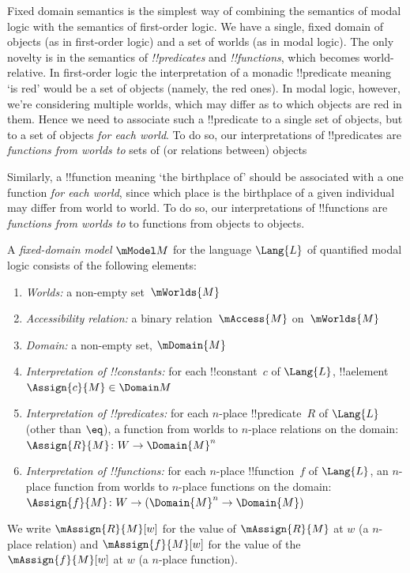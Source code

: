 \documentclass[../../../include/open-logic-section]{subfiles}
\begin{document}


\begin{explain}
Fixed domain semantics is the simplest way of combining the semantics
of modal logic with the semantics of first-order logic. We have a 
single, fixed domain of objects (as in first-order logic) and a 
set of worlds (as in modal logic). The only novelty is in the 
semantics of \emph{!!{predicate}s} and \emph{!!{function}s}, which becomes world-relative. 
In first-order logic the interpretation of a monadic !!{predicate} 
meaning `is red' would be a set of objects (namely, the red ones). 
In modal logic, however, we're considering
multiple worlds, which may differ as to which objects are red in them. 
Hence we need to associate such a !!{predicate} to a single set of 
objects, but to a set of objects \emph{for each world}. To do so,
our interpretations of !!{predicate}s are \emph{functions from worlds to} 
sets of (or relations between) objects

Similarly, a 
!!{function} meaning `the birthplace of' should be associated with a 
one function \emph{for each world}, since which place is the birthplace of a given 
individual may differ from world to world. To do so, our 
interpretations of !!{function}s are \emph{functions from worlds to} 
to functions from objects to objects.
\end{explain}

\begin{defn}
    A \emph{fixed-domain model} $\mModel M$ for the language $\Lang{L}$ 
    of quantified modal logic consists of the following elements:
    \begin{enumerate}
    \item \emph{Worlds:} a non-empty set~$\mWorlds{M}$
    \item \emph{Accessibility relation:} a binary relation~$\mAccess{M}$ on~$\mWorlds{M}$
    \item \emph{Domain:} a non-empty set, $\mDomain{M}$
\item \emph{Interpretation of !!{constant}s:} for each !!{constant}~$c$ of
  $\Lang{L}$, !!a{element} $\Assign{c}{M} \in \Domain M$
\item \emph{Interpretation of !!{predicate}s:} for each $n$-place
  !!{predicate}~$R$ of $\Lang{L}$ (other than $\eq$), a function 
  from worlds to $n$-place
  relations on the domain: $\Assign{R}{M} \colon W \to \Domain{M}^n$
\item \emph{Interpretation of !!{function}s:} for each $n$-place
  !!{function}~$f$ of $\Lang{L}$, an $n$-place function from worlds 
  to $n$-place functions on the domain: $\Assign{f}{M} \colon W \to 
  (\Domain{M}^n \to \Domain{M})$

\end{enumerate}

We write $\mAssign{R}{M}[w]$ for the value of $\mAssign{R}{M}$ at $w$ (a $n$-place relation) and $\mAssign{f}{M}[w]$ for the value of the 
$\mAssign{f}{M}[w]$ at $w$ (a $n$-place function). 
\end{defn}
\end{document}
